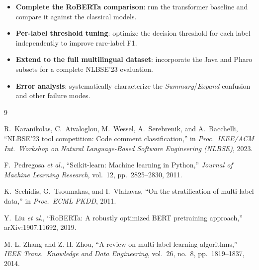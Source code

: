 \documentclass[11pt,a4paper]{article}
\begin{document}
\begin{itemize}[nosep]
    \item \textbf{Complete the RoBERTa comparison}: run the transformer baseline
          and compare it against the classical models.
    \item \textbf{Per-label threshold tuning}: optimize the decision threshold
          for each label independently to improve rare-label F1.
    \item \textbf{Extend to the full multilingual dataset}: incorporate the Java
          and Pharo subsets for a complete NLBSE'23 evaluation.
    \item \textbf{Error analysis}: systematically characterize the
          \textit{Summary}/\textit{Expand} confusion and other failure modes.
\end{itemize}



\begin{thebibliography}{9}

R.~Karanikolas, C.~Aivaloglou, M.~Wessel, A.~Serebrenik, and A.~Bacchelli,
``NLBSE'23 tool competition: Code comment classification,''
in \textit{Proc.\ IEEE/ACM Int.\ Workshop on Natural Language-Based Software
Engineering (NLBSE)}, 2023.

F.~Pedregosa \textit{et al.},
``Scikit-learn: Machine learning in Python,''
\textit{Journal of Machine Learning Research}, vol.~12, pp.~2825--2830, 2011.

K.~Sechidis, G.~Tsoumakas, and I.~Vlahavas,
``On the stratification of multi-label data,''
in \textit{Proc.\ ECML PKDD}, 2011.

Y.~Liu \textit{et al.},
``RoBERTa: A robustly optimized BERT pretraining approach,''
arXiv:1907.11692, 2019.

M.-L. Zhang and Z.-H. Zhou,
``A review on multi-label learning algorithms,''
\textit{IEEE Trans.\ Knowledge and Data Engineering}, vol.~26, no.~8,
pp.~1819--1837, 2014.

\end{thebibliography}
\end{document}
